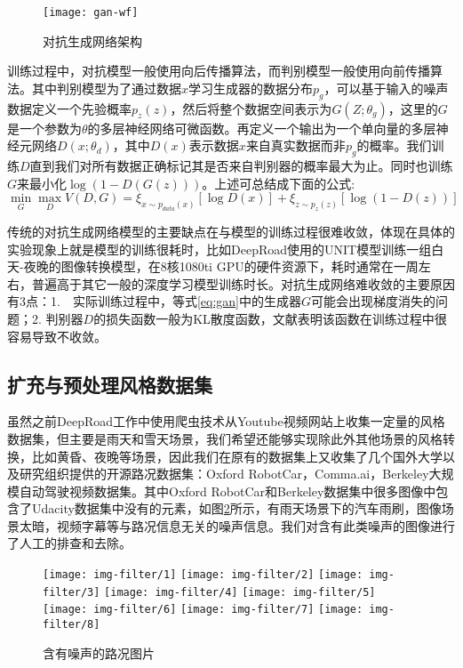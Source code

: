 \begin{figure}[h]
    \centering
    \texttt{[image: gan-wf]}
    \caption{对抗生成网络架构}
    \label{gan-wf}
\end{figure}

训练过程中，对抗模型一般使用向后传播算法，而判别模型一般使用向前传播算法。其中判别模型为了通过数据$x$学习生成器的数据分布$p_g$，可以基于输入的噪声数据定义一个先验概率$p_z(z)$，然后将整个数据空间表示为$G(Z;\theta_g)$，这里的$G$是一个参数为$\theta$的多层神经网络可微函数。再定义一个输出为一个单向量的多层神经元网络$D(x;\theta_d)$，其中$D(x)$表示数据$x$来自真实数据而非$p_g$的概率。我们训练$D$直到我们对所有数据正确标记其是否来自判别器的概率最大为止。同时也训练$G$来最小化$\log(1-D(G(z)))$。上述可总结成下面的公式:
\begin{equation}
    \label{eq:gan}
    \min_G\max_DV(D,G)=\xi_{x\sim p_{data}(x)}[\log D(x)]+\xi_{z\sim p_z(z)}[\log(1-D(z))]
\end{equation}

传统的对抗生成网络模型的主要缺点在与模型的训练过程很难收敛，体现在具体的实验现象上就是模型的训练很耗时，比如DeepRoad使用的UNIT模型训练一组白天-夜晚的图像转换模型，在8核1080ti GPU的硬件资源下，耗时通常在一周左右，普遍高于其它一般的深度学习模型训练时长。对抗生成网络难收敛的主要原因有3点：1.　实际训练过程中，等式\eqref{eq:gan}中的生成器$G$可能会出现梯度消失的问题；2. 判别器$D$的损失函数一般为KL散度函数，文献\cite{arj}表明该函数在训练过程中很容易导致不收敛。

\subsection{扩充与预处理风格数据集}

虽然之前DeepRoad工作中使用爬虫技术从Youtube视频网站上收集一定量的风格数据集，但主要是雨天和雪天场景，我们希望还能够实现除此外其他场景的风格转换，比如黄昏、夜晚等场景，因此我们在原有的数据集上又收集了几个国外大学以及研究组织提供的开源路况数据集：Oxford RobotCar\cite{ds:oxford}，Comma.ai\cite{ds:ai}，Berkeley大规模自动驾驶视频数据集\cite{ds:berkeley}。其中Oxford RobotCar和Berkeley数据集中很多图像中包含了Udacity数据集中没有的元素，如图\ref{fig-bads}所示，有雨天场景下的汽车雨刷，图像场景太暗，视频字幕等与路况信息无关的噪声信息。我们对含有此类噪声的图像进行了人工的排查和去除。

\begin{figure}[h]
    \centering
    \texttt{[image: img-filter/1]}
    \texttt{[image: img-filter/2]}
    \texttt{[image: img-filter/3]}
    \texttt{[image: img-filter/4]}
    \texttt{[image: img-filter/5]}
    \texttt{[image: img-filter/6]}
    \texttt{[image: img-filter/7]}
    \texttt{[image: img-filter/8]}
    \caption{含有噪声的路况图片} 
    \label{fig-bads}
\end{figure}

